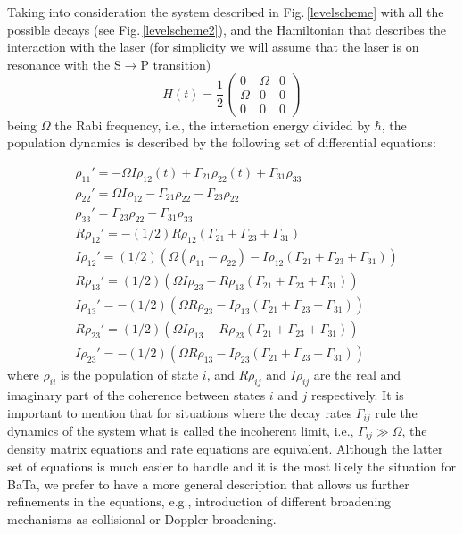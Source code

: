 Taking into consideration the system described in Fig.\,\ref{levelscheme} with all the possible decays (see Fig.\,\ref{levelscheme2}), and the Hamiltonian that describes the interaction with the laser (for simplicity we will assume that the laser is on resonance with the S$\rightarrow$P transition)
\begin{equation}
H(t)=\frac{1}{2}\left(
\begin{matrix} 
0& \Omega & 0  \\
\Omega & 0 & 0   \\
0 & 0 & 0
\end{matrix}
\right)
\end{equation}
being $\Omega$ the Rabi frequency, i.e., the interaction energy divided by $\hbar$, the population dynamics is described by the following set of differential equations:

\begin{align}
\label{density}
& \rho_{11}'  = -\Omega I\rho_{12}(t) +\Gamma_{21}\rho_{22}(t)+ \Gamma_{31}\rho_{33}  \\ \nonumber
& \rho_{22}'  = \Omega I\rho_{12}-\Gamma_{21}\rho_{22} - \Gamma_{23}\rho_{22}\\  \nonumber
& \rho_{33}'  = \Gamma_{23}\rho_{22}-\Gamma_{31}\rho_{33}\\  \nonumber
& R\rho_{12}'  = - (1/2) R\rho_{12} (\Gamma_{21} +\Gamma_{23} + \Gamma_{31})\\  \nonumber
& I\rho_{12}'  =(1/2)( \Omega (\rho_{11}-\rho_{22}) - I\rho_{12}(\Gamma_{21}+\Gamma_{23}+\Gamma_{31}))\\  \nonumber
& R\rho_{13}'  = (1/2)(\Omega I\rho_{23} -R\rho_{13} (\Gamma_{21}+ \Gamma_{23} + \Gamma_{31}))\\  \nonumber
& I\rho_{13}'  =-(1/ 2)(\Omega R\rho_{23} -I\rho_{13} (\Gamma_{21}+ \Gamma_{23} + \Gamma_{31}))\\  \nonumber
& R\rho_{23}'  = (1/2)( \Omega I\rho_{13} - R\rho_{23} (\Gamma_{21}+ \Gamma_{23} + \Gamma_{31}))\\  \nonumber
& I\rho_{23}'  = -(1/2)( \Omega R\rho_{13}- I\rho_{23} (\Gamma_{21}+ \Gamma_{23} + \Gamma_{31}))
\end{align}
where $\rho_{ii}$ is the population of state $i$, and $R\rho_{ij}$ and $I\rho_{ij}$ are the real and imaginary part of the coherence between states $i$ and $j$ respectively. It is important to mention that for situations where the decay rates $\Gamma_{ij}$ rule the dynamics of the system what is called the incoherent limit, i.e., $\Gamma_{ij}\gg\Omega$, the density matrix equations and rate equations are equivalent. Although the latter set of equations is much easier to handle and it is the most likely the situation for BaTa, we prefer to have a more general description that allows us further refinements in the equations, e.g., introduction of different broadening mechanisms as collisional or Doppler broadening. 

